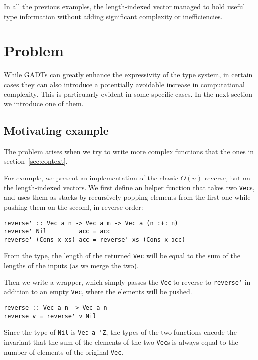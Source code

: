 In all the previous examples, the length-indexed vector managed to hold useful type information without adding significant complexity or inefficiencies.

\section{Problem}
\label{sec:problem}

While GADTs can greatly enhance the expressivity of the type system, in certain cases they can also introduce a potentially avoidable increase in computational complexity.
This is particularly evident in some specific cases.
In the next section we introduce one of them.

\subsection{Motivating example}
\label{subsec:motivating-example}

The problem arises when we try to write more complex functions that the ones in section~\ref{sec:context}.

For example, we present an implementation of the classic $O(n)$ reverse, but on the length-indexed vectors.
We first define an helper function that takes two \texttt{Vec}s, and uses them as stacks by recursively popping elements from the first one while pushing them on the second, in reverse order:

\begin{lstlisting}
reverse' :: Vec a n -> Vec a m -> Vec a (n :+: m)
reverse' Nil         acc = acc
reverse' (Cons x xs) acc = reverse' xs (Cons x acc)
\end{lstlisting}

From the type, the length of the returned \texttt{Vec} will be equal to the sum of the lengths of the inputs (as we merge the two).

Then we write a wrapper, which simply passes the \texttt{Vec} to reverse to \texttt{reverse'} in addition to an empty \texttt{Vec}, where the elements will be pushed.

\begin{lstlisting}
reverse :: Vec a n -> Vec a n
reverse v = reverse' v Nil
\end{lstlisting}

Since the type of \texttt{Nil} is \texttt{Vec a 'Z}, the types of the two functions encode the invariant that the sum of the elements of the two \texttt{Vec}s is always equal to the number of elements of the original \texttt{Vec}.

